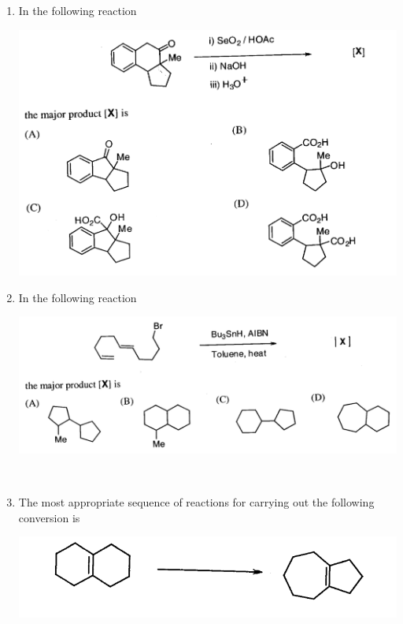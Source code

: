 \documentclass[journal,12pt,onecolumn]{IEEEtran}
\theoremstyle{remark}
\begin{document}
\begin{enumerate}
 

\item    \hspace{0.5cm} In the following reaction  \hfill{}

\begin{center}
\includegraphics[width=\textwidth]{figs/image13.png}
\end{center}


 

\item    \hspace{0.5cm} In the following reaction  \hfill{}

\begin{center}
\includegraphics[width=\textwidth]{figs/image14.png}
\end{center}

 

\newpage
\


\item    \hspace{0.5cm} The most appropriate sequence of reactions for carrying out the following conversion is  \hfill{}

\begin{center}
\includegraphics[width=\textwidth]{figs/image15.png}
\end{center}


\end{enumerate}
\end{document}
